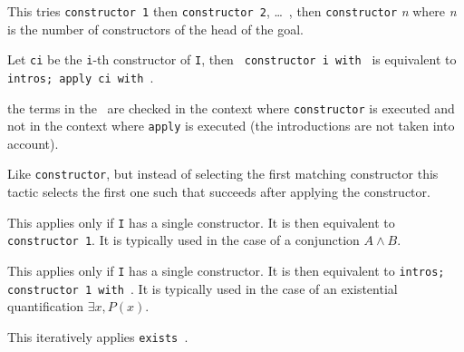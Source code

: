 \begin{Variants}
\item {}

  This tries \texttt{constructor 1} then \texttt{constructor 2},
  \dots\ , then \texttt{constructor} \textit{n} where \textit{n} is
  the number of constructors of the head of the goal.

\item {}

  Let {\tt ci} be the {\tt i}-th constructor of {\tt I}, then {\tt
    constructor i with \bindinglist} is equivalent to {\tt intros;
    apply ci with \bindinglist}.

  \Warning the terms in the \bindinglist\ are checked
  in the context where {\tt constructor} is executed and not in the
  context where {\tt apply} is executed (the introductions are not
  taken into account).

\item {}

  Like {\tt constructor}, but instead of selecting the first matching
  constructor this tactic selects the first one such that {\tac} succeeds
  after applying the constructor.

\item {}

  This applies only if {\tt I} has a single constructor. It is then
  equivalent to {\tt constructor 1}. It is typically used in the case
  of a conjunction $A\land B$.

  \ErrMsg {}

\item {}

  This applies only if {\tt I} has a single constructor. It is then
  equivalent to {\tt intros; constructor 1 with \bindinglist}. It is
  typically used in the case of an existential quantification $\exists
  x, P(x)$.

  \ErrMsg {}

\item {}

  This iteratively applies {\tt exists {\bindinglist}}.

\item {}\\
      {}


\end{Variants}
